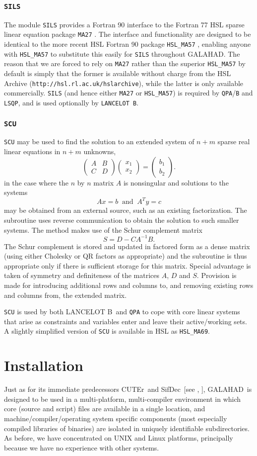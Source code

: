 \documentclass[acmtocl,acmnow]{acmtrans2m}
\newcommand{\tim}[1]{\;\; \mbox{#1} \;\;}
\newcommand{\gal}{{\sf GALAHAD}}
\newcommand{\lanb}{{\sf LANCELOT B}}
\newcommand{\cuter}{{\sf CUTEr}}
\newcommand{\sifdec}{{\sf SifDec}}
\newcommand{\ltsubsubsection}[1]{\subsubsection{{\tt #1}} \label{#1}}
\newcommand{\resetcounters}{\setcounter{equation}{0} \setcounter{figure}{0} 
 \setcounter{table}{0}}
\newcommand{\lsection}[1]{\section{#1} \resetcounters \label{#1}}
\newcommand{\bciteb}[1]{\citeauthor{#1}, \citeyear{#1}}
\newcommand{\disp}[1]{\[{#1}\]}
\newcommand{\vect}[1]{\left(\begin{array}{c}#1\end{array}\right)}
\newcommand{\mat}[2]{\left(\begin{array}{#1}#2\end{array}\right)}
\begin{document}
\ltsubsubsection{SILS}

The module {\tt SILS} provides a Fortran 90 interface to the Fortran 77 HSL
sparse linear equation package {\tt MA27} \cite{DuffReid82}. 
The interface and functionality are 
designed to be identical to the more recent HSL Fortran 90 
package {\tt HSL\_MA57} \cite{Duff01}, enabling anyone with {\tt HSL\_MA57}
to substitute this easily for {\tt SILS} throughout \gal. The reason
that we are forced to rely on {\tt MA27} rather than the superior 
{\tt HSL\_MA57} by default is simply that
the former is available without charge from the HSL Archive
({\tt http://hsl.rl.ac.uk/hslarchive}), while the latter is only available
commercially.
{\tt SILS} (and hence either {\tt MA27} or {\tt HSL\_MA57}) 
is required by {\tt QPA}/{\tt B} and {\tt LSQP}, and is
used optionally by {\tt LANCELOT B}.

\ltsubsubsection{SCU}

{\tt SCU} may be used to find the solution
to an extended system of $n + m$ 
sparse real linear equations in $n  +  m$ unknowns,
\disp{\mat{cc}{ A & B \\ C & D } \vect{x_1 \\ x_2}
 =  \vect{b_1 \\ b_2}.}
in the case where the $n$ by $n$ matrix $A$ is nonsingular 
and solutions to the systems 
\disp{A x  =  b \tim{and} A^T y  =  c}
may be obtained from an external source, such as an existing 
factorization.  The subroutine uses reverse communication to obtain 
the solution to such smaller systems.  The method makes use of 
the Schur complement matrix 
\disp{S  =  D  -  C    A^{-1} B.}
The Schur complement is stored and updated in factored form as a dense matrix 
(using either Cholesky or QR factors as appropriate)
and the subroutine is thus appropriate only if there is 
sufficient storage for this matrix. Special advantage is taken 
of symmetry and definiteness of the matrices $A$, $D$ and $S$. 
Provision is made for introducing additional rows and columns 
to, and removing existing rows and columns from, the extended matrix. 

{\tt SCU} is used by both \lanb\ and {\tt QPA} to cope
with core linear systems that arise as constraints and variables
enter and leave their active/working sets. A slightly simplified
version of {\tt SCU} is available in HSL as {\tt HSL\_MA69}.

\lsection{Installation}

Just as for its immediate predecessors \cuter\ and \sifdec\
[see \bciteb{GoulOrbaToin02b}],
\gal\ is designed to be used in a multi-platform, multi-compiler 
environment in which core (source and script) files are available
in a single location, and machine/compiler/operating system specific
components (most especially compiled libraries of binaries) are isolated in
uniquely identifiable subdirectories. As before, we have concentrated on 
UNIX and Linux platforms, principally because we have no experience with 
other systems.
\end{document}
